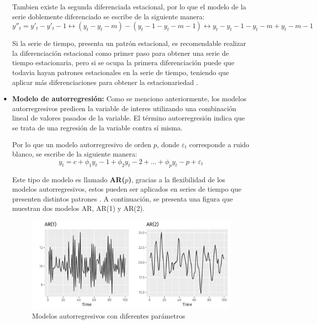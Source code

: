 \begin{itemize}
    Tambien existe la segunda diferenciada estacional, por lo que el modelo de la serie doblemente diferenciado se escribe de la siguiente manera:
    \begin{equation*}
        y''_t=y'_t-y'_t-1 \leftrightarrow (y_t-y_t-m)-(y_t-1-y_t-m-1) \leftrightarrow y_t-y_t-1-y_t-m+y_t-m-1
    \end{equation*}

    Si la serie de tiempo, presenta un patrón estacional, es recomendable realizar la diferenciación estacional como primer paso para obtener una serie de tiempo estacionaria, pero si se ocupa la primera diferenciación puede que todavia hayan patrones estacionales en la serie de tiempo, teniendo que aplicar más diferenciaciones para obtener la estacionariedad \cite{forecast-time-series-arima}.

    \item \textbf{Modelo de autorregresión:} Como se menciono anteriormente, los modelos autorregresivos predicen la variable de interes utilizando una combinación lineal de valores pasados de la variable. El término autorregresión indica que se trata de una regresión de la variable contra sí misma.
    
    Por lo que un modelo autorregresivo de orden $p$, donde $\varepsilon_t$ corresponde a ruido blanco, se escribe de la siguiente manera:
    \begin{equation*}
        y_t=c+\phi_1y_t-1+\phi_2y_t-2+...+\phi_py_t-p+\varepsilon_t
    \end{equation*}

    Este tipo de modelo es llamado \textbf{AR($p$)}, gracias a la flexibilidad de los modelos autorregresivos, estos pueden ser aplicados en series de tiempo que presenten distintos patrones \cite{forecast-time-series-arima}. A continuación, se presenta una figura que muestran dos modelos AR, AR(1) y AR(2).

    \begin{figure}[H]
        \begin{minipage}[t]{0.9\textwidth}
            \caption{Modelos autorregresivos con diferentes parámetros}
            \label{ARmodel}        
        \end{minipage}
    
        \vspace{10pt}
    
        \begin{minipage}[b]{0.9\textwidth}
            \centering
            \includegraphics[width=\textwidth]{img/arp-1-example.png}        
        \end{minipage}
    

\end{figure}
\end{itemize}
